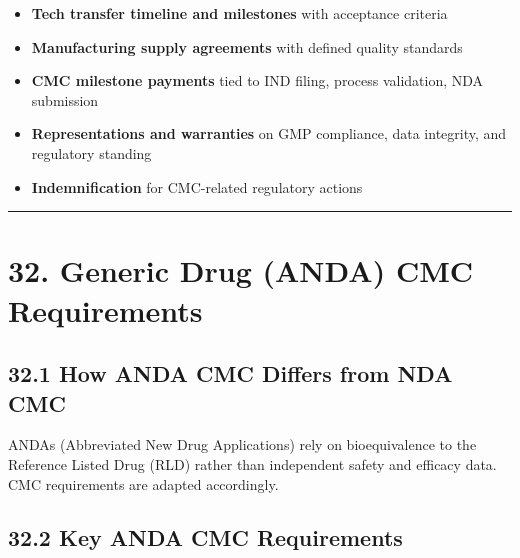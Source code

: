 \documentclass[
  11pt,
  a4paper,
]{report}
\providecommand{\tightlist}{%
  \setlength{\itemsep}{0pt}\setlength{\parskip}{0pt}}
\begin{document}
\begin{itemize}
\tightlist
\item
  \textbf{Tech transfer timeline and milestones} with acceptance
  criteria
\item
  \textbf{Manufacturing supply agreements} with defined quality
  standards
\item
  \textbf{CMC milestone payments} tied to IND filing, process
  validation, NDA submission
\item
  \textbf{Representations and warranties} on GMP compliance, data
  integrity, and regulatory standing
\item
  \textbf{Indemnification} for CMC-related regulatory actions
\end{itemize}

\begin{center}\rule{0.5\linewidth}{0.5pt}\end{center}

\hypertarget{generic-drug-anda-cmc-requirements}{%
\section{32. Generic Drug (ANDA) CMC
Requirements}\label{generic-drug-anda-cmc-requirements}}

\hypertarget{how-anda-cmc-differs-from-nda-cmc}{%
\subsection{32.1 How ANDA CMC Differs from NDA
CMC}\label{how-anda-cmc-differs-from-nda-cmc}}

ANDAs (Abbreviated New Drug Applications) rely on bioequivalence to the
Reference Listed Drug (RLD) rather than independent safety and efficacy
data. CMC requirements are adapted accordingly.

\hypertarget{key-anda-cmc-requirements}{%
\subsection{32.2 Key ANDA CMC
Requirements}\label{key-anda-cmc-requirements}}
\end{document}
